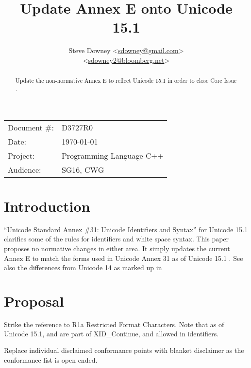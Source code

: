 \documentclass[a4paper,10pt,oneside,openany,final,article]{memoir}
\begin{document}
\title{Update Annex E onto Unicode 15.1}
\author{
  Steve Downey \small<\href{mailto:sdowney@gmail.com}{sdowney@gmail.com}> \\
  \small<\href{mailto:sdowney2@bloomberg.net}{sdowney2@bloomberg.net}> \\
}
\date{} %
\maketitle

\begin{flushright}
  \begin{tabular}{ll}
    Document \#: & D3727R0 \\
    Date: & \today \\
    Project: & Programming Language C++ \\
    Audience: & SG16, CWG
  \end{tabular}
\end{flushright}

\begin{abstract}
  Update the non-normative Annex E to reflect Unicode 15.1 in order to close Core Issue \cite{CWG2843}.
\end{abstract}

\tableofcontents*


\chapter{Introduction}

``Unicode Standard Annex \#31: Unicode Identifiers and Syntax'' for Unicode 15.1 \cite{UAX31-15.1:online} clarifies some of the rules for identifiers and white space syntax.
This paper proposes no normative changes in either area. It simply updates the current Annex E to match the forms used in Unicode Annex 31 as of Unicode 15.1 \cite{unicode_15_1}. See also the differences from Unicode 14 as marked up in \cite{UAX31-15.1-DIFF:online}

\chapter{Proposal}

Strike the reference to R1a Restricted Format Characters. Note that as of Unicode 15.1,  and  are part of XID_Continue, and allowed in identifiers.

Replace individual disclaimed conformance points with blanket disclaimer as the conformance list is open ended.
\end{document}
